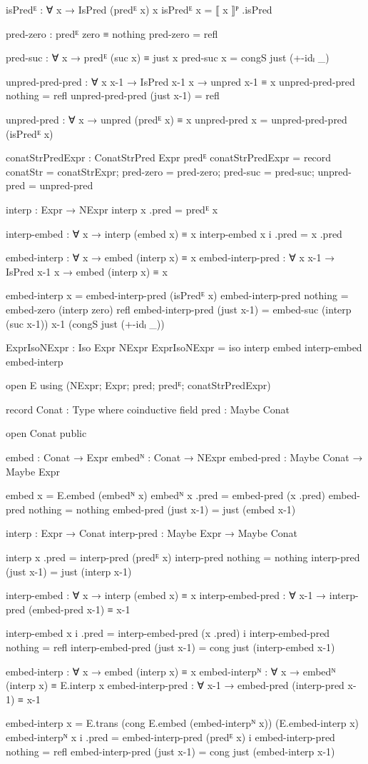 \begin{code}[hide]
  isPredᴱ : ∀ x → IsPred (predᴱ x) x
  isPredᴱ x = ⟦ x ⟧ᴾ .isPred

  pred-zero : predᴱ zero ≡ nothing
  pred-zero = refl

  pred-suc : ∀ x → predᴱ (suc x) ≡ just x
  pred-suc x = congS just (+-idₗ _)

  unpred-pred-pred : ∀ {x x-1} → IsPred x-1 x → unpred x-1 ≡ x
  unpred-pred-pred nothing = refl
  unpred-pred-pred (just x-1) = refl

  unpred-pred : ∀ x → unpred (predᴱ x) ≡ x
  unpred-pred x = unpred-pred-pred (isPredᴱ x)

  conatStrPredExpr : ConatStrPred Expr predᴱ
  conatStrPredExpr =
    record
      { conatStr = conatStrExpr;
        pred-zero = pred-zero;
        pred-suc = pred-suc;
        unpred-pred = unpred-pred }

  interp : Expr → NExpr
  interp x .pred = predᴱ x

  interp-embed : ∀ x → interp (embed x) ≡ x
  interp-embed x i .pred = x .pred

  embed-interp : ∀ x → embed (interp x) ≡ x
  embed-interp-pred : ∀ {x x-1} → IsPred x-1 x → embed (interp x) ≡ x

  embed-interp x = embed-interp-pred (isPredᴱ x)
  embed-interp-pred nothing = embed-zero (interp zero) refl
  embed-interp-pred (just x-1) =
    embed-suc (interp (suc x-1)) x-1 (congS just (+-idₗ _))

  ExprIsoNExpr : Iso Expr NExpr
  ExprIsoNExpr = iso interp embed interp-embed embed-interp

open E using (NExpr; Expr; pred; predᴱ; conatStrPredExpr)

record Conat : Type where
  coinductive
  field pred : Maybe Conat

open Conat public

embed : Conat → Expr
embedᴺ : Conat → NExpr
embed-pred : Maybe Conat → Maybe Expr

embed x = E.embed (embedᴺ x)
embedᴺ x .pred = embed-pred (x .pred)
embed-pred nothing = nothing
embed-pred (just x-1) = just (embed x-1)

interp : Expr → Conat
interp-pred : Maybe Expr → Maybe Conat

interp x .pred = interp-pred (predᴱ x)
interp-pred nothing = nothing
interp-pred (just x-1) = just (interp x-1)

interp-embed : ∀ x → interp (embed x) ≡ x
interp-embed-pred : ∀ x-1 → interp-pred (embed-pred x-1) ≡ x-1

interp-embed x i .pred = interp-embed-pred (x .pred) i
interp-embed-pred nothing = refl
interp-embed-pred (just x-1) = cong just (interp-embed x-1)

embed-interp : ∀ x → embed (interp x) ≡ x
embed-interpᴺ : ∀ x → embedᴺ (interp x) ≡ E.interp x
embed-interp-pred : ∀ x-1 → embed-pred (interp-pred x-1) ≡ x-1

embed-interp x = E.trans (cong E.embed (embed-interpᴺ x)) (E.embed-interp x)
embed-interpᴺ x i .pred = embed-interp-pred (predᴱ x) i
embed-interp-pred nothing = refl
embed-interp-pred (just x-1) = cong just (embed-interp x-1)
\end{code}
